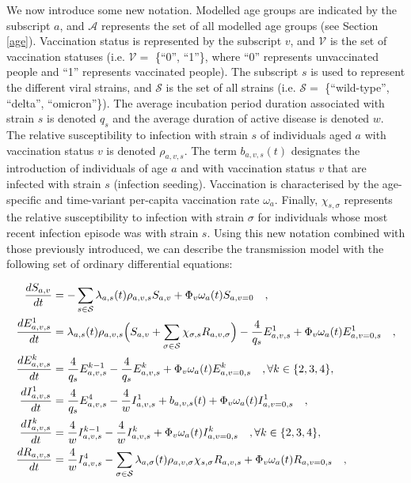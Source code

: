 We now introduce some new notation. Modelled age groups are indicated by the subscript $a$, and $\mathcal{A}$ represents
the set of all modelled age groups (see Section \ref{age}). Vaccination status is represented by the subscript $v$, and $\mathcal{V}$ is the set of 
vaccination statuses (i.e. $\mathcal{V}=$ \{``0'', ``1''\}, where ``0'' represents unvaccinated people and ``1'' represents vaccinated people). The subscript $s$ is used to represent the different viral strains, and $\mathcal{S}$ is the set 
of all strains (i.e. $\mathcal{S}=$ \{``wild-type'', ``delta'', ``omicron''\}). The average incubation period duration associated with strain $s$ is denoted $q_s$ and
the average duration of active disease is denoted $w$. The relative susceptibility to infection with strain $s$ of individuals aged $a$ with 
vaccination status $v$ is denoted $\rho_{a,v,s}$. The term $b_{a,v,s}(t)$ designates the introduction of individuals of age $a$ and 
with vaccination status $v$ that are infected with strain $s$ (infection seeding). Vaccination is characterised by the age-specific
and time-variant per-capita vaccination rate $\omega_a$. Finally, $\chi_{s,\sigma}$ represents the relative susceptibility to infection
with strain $\sigma$ for individuals whose most recent infection episode was with strain $s$. Using this new notation combined 
with those previously introduced, we can describe the transmission model with the following set of ordinary differential equations:

\begin{equation}
    \label{ode}
    \begin{split}
\frac{dS_{a,v}}{dt} & = -\sum_{s \in \mathcal{S}} \lambda_{a,s}(t)\rho_{a,v,s} S_{a,v} + \Phi_v\omega_a(t)S_{a,v=0}  \quad , \\
\frac{dE_{a,v,s}^{1}}{dt} & =\lambda_{a,s}(t)\rho_{a,v,s} \Bigl(S_{a,v}  +  \sum_{\sigma \in \mathcal{S}} \chi_{\sigma, s} R_{a,v,\sigma} \Bigr) - \frac{4}{q_{s}}E_{a,v,s}^{1} + \Phi_v\omega_a(t)E_{a,v=0,s}^1 \quad , \\
\frac{dE_{a,v,s}^{k}}{dt} & = \frac{4}{q_{s}}E_{a,v,s}^{k-1} - \frac{4}{q_{s}}E_{a,v,s}^{k} + \Phi_v\omega_a(t)E_{a,v=0,s}^k \quad,  \forall k \in \{2,3,4\} , \\
\frac{dI_{a,v,s}^{1}}{dt} & = \frac{4}{q_{s}}E_{a,v,s}^{4} - \frac{4}{w}I_{a,v,s}^{1} + b_{a,v,s}(t) + \Phi_v\omega_a(t)I_{a,v=0,s}^1 \quad , \\
\frac{dI_{a,v,s}^{k}}{dt} & = \frac{4}{w}I_{a,v,s}^{k-1} - \frac{4}{w}I_{a,v,s}^{k} + \Phi_v\omega_a(t)I_{a,v=0,s}^k \quad, \forall k \in \{2,3,4\} , \\
\frac{dR_{a,v,s}}{dt} & = \frac{4}{w}I_{a,v,s}^{4} - \sum _{\sigma \in \mathcal{S}} \lambda_{a,\sigma}(t)\rho_{a,v,\sigma} \chi_{s, \sigma} R_{a,v, s} + \Phi_v\omega_a(t)R_{a,v=0,s} \quad, 
    \end{split}
\end{equation}

